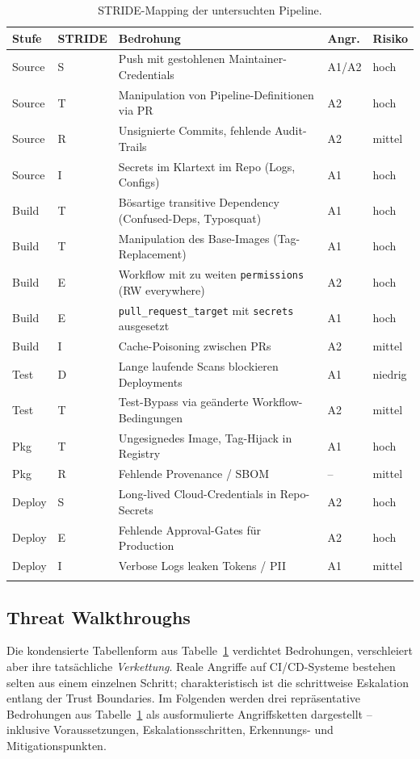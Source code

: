 \documentclass[12pt, a4paper]{scrartcl}
\begin{document}
\begin{longtable}{p{1.6cm} p{2.0cm} p{7.4cm} p{1.4cm} p{1.4cm}}
\toprule
\textbf{Stufe} & \textbf{STRIDE} & \textbf{Bedrohung} & \textbf{Angr.} & \textbf{Risiko} \\
\midrule \endhead
Source & S & Push mit gestohlenen Maintainer-Credentials & A1/A2 & hoch \\
Source & T & Manipulation von Pipeline-Definitionen via PR & A2 & hoch \\
Source & R & Unsignierte Commits, fehlende Audit-Trails & A2 & mittel \\
Source & I & Secrets im Klartext im Repo (Logs, Configs) & A1 & hoch \\
Build  & T & Bösartige transitive Dependency (Confused-Deps, Typosquat) & A1 & hoch \\
Build  & T & Manipulation des Base-Images (Tag-Replacement) & A1 & hoch \\
Build  & E & Workflow mit zu weiten \texttt{permissions} (RW everywhere) & A2 & hoch \\
Build  & E & \texttt{pull\_request\_target} mit \texttt{secrets} ausgesetzt & A1 & hoch \\
Build  & I & Cache-Poisoning zwischen PRs & A2 & mittel \\
Test   & D & Lange laufende Scans blockieren Deployments & A1 & niedrig \\
Test   & T & Test-Bypass via geänderte Workflow-Bedingungen & A2 & mittel \\
Pkg    & T & Ungesignedes Image, Tag-Hijack in Registry & A1 & hoch \\
Pkg    & R & Fehlende Provenance / SBOM & -- & mittel \\
Deploy & S & Long-lived Cloud-Credentials in Repo-Secrets & A2 & hoch \\
Deploy & E & Fehlende Approval-Gates für Production & A2 & hoch \\
Deploy & I & Verbose Logs leaken Tokens / PII & A1 & mittel \\
\bottomrule
\caption{STRIDE-Mapping der untersuchten Pipeline.}
\label{tab:stride}
\end{longtable}

\subsection{Threat Walkthroughs}\label{sec:walkthroughs}
Die kondensierte Tabellenform aus Tabelle~\ref{tab:stride} verdichtet
Bedrohungen, verschleiert aber ihre tatsächliche \emph{Verkettung}. Reale
Angriffe auf CI/CD-Systeme bestehen selten aus einem einzelnen Schritt;
charakteristisch ist die schrittweise Eskalation entlang der Trust
Boundaries. Im Folgenden werden drei repräsentative Bedrohungen aus
Tabelle~\ref{tab:stride} als ausformulierte Angriffsketten dargestellt --
inklusive Voraussetzungen, Eskalationsschritten, Erkennungs- und
Mitigationspunkten.
\end{document}
